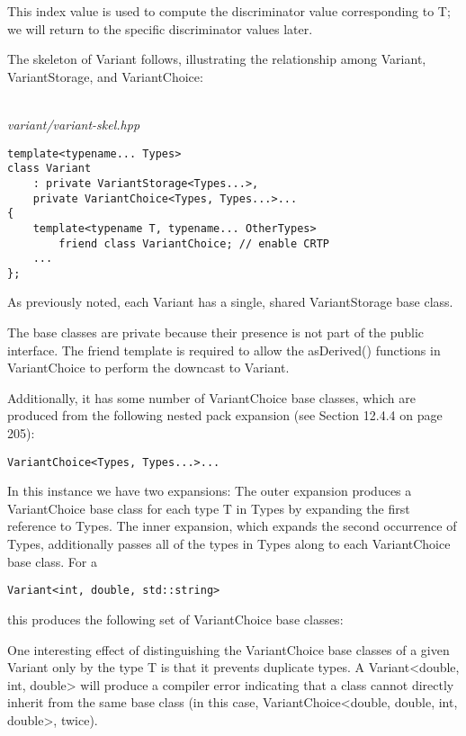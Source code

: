 This index value is used to compute the discriminator value corresponding to T; we will return to the specific discriminator values later.

The skeleton of Variant follows, illustrating the relationship among Variant, VariantStorage, and VariantChoice:

\hspace*{\fill} \\ %
\noindent
\textit{variant/variant-skel.hpp}
\begin{lstlisting}[style=styleCXX]
template<typename... Types>
class Variant
	: private VariantStorage<Types...>,
	private VariantChoice<Types, Types...>...
{
	template<typename T, typename... OtherTypes>
		friend class VariantChoice; // enable CRTP
	...
};
\end{lstlisting}

As previously noted, each Variant has a single, shared VariantStorage base class.

\begin{tcolorbox}[colback=webgreen!5!white,colframe=webgreen!75!black]
\hspace*{0.75cm}The base classes are private because their presence is not part of the public interface. The friend template is required to allow the asDerived() functions in VariantChoice to perform the downcast to Variant.
\end{tcolorbox}

Additionally, it has some number of VariantChoice base classes, which are produced from the following nested pack expansion (see Section 12.4.4 on page 205):

\begin{lstlisting}[style=styleCXX]
VariantChoice<Types, Types...>...
\end{lstlisting}

In this instance we have two expansions: The outer expansion produces a VariantChoice base class for each type T in Types by expanding the first reference to Types. The inner expansion, which expands the second occurrence of Types, additionally passes all of the types in Types along to each VariantChoice base class. For a

\begin{lstlisting}[style=styleCXX]
Variant<int, double, std::string>
\end{lstlisting}

this produces the following set of VariantChoice base classes:

\begin{tcolorbox}[colback=webgreen!5!white,colframe=webgreen!75!black]
\hspace*{0.75cm}One interesting effect of distinguishing the VariantChoice base classes of a given Variant only by the type T is that it prevents duplicate types. A Variant<double, int, double> will produce a compiler error indicating that a class cannot directly inherit from the same base class (in this case, VariantChoice<double, double, int, double>, twice).
\end{tcolorbox}

